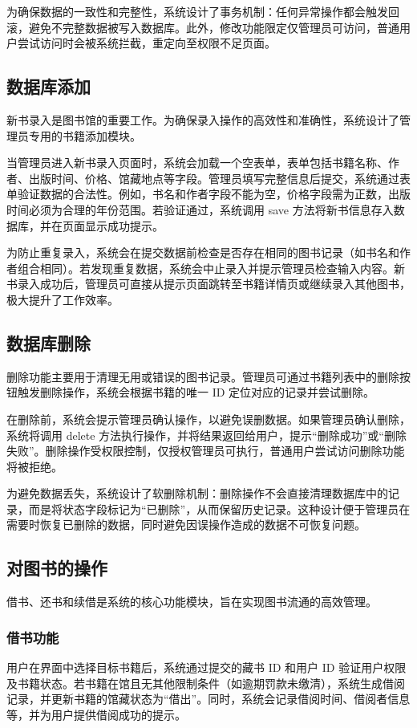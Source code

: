 \documentclass[a4paper,14pt]{article}
\begin{document}
为确保数据的一致性和完整性，系统设计了事务机制：任何异常操作都会触发回滚，避免不完整数据被写入数据库。此外，修改功能限定仅管理员可访问，普通用户尝试访问时会被系统拦截，重定向至权限不足页面。

\subsection{数据库添加} 新书录入是图书馆的重要工作。为确保录入操作的高效性和准确性，系统设计了管理员专用的书籍添加模块。

当管理员进入新书录入页面时，系统会加载一个空表单，表单包括书籍名称、作者、出版时间、价格、馆藏地点等字段。管理员填写完整信息后提交，系统通过表单验证数据的合法性。例如，书名和作者字段不能为空，价格字段需为正数，出版时间必须为合理的年份范围。若验证通过，系统调用 save\(\) 方法将新书信息存入数据库，并在页面显示成功提示。

为防止重复录入，系统会在提交数据前检查是否存在相同的图书记录（如书名和作者组合相同）。若发现重复数据，系统会中止录入并提示管理员检查输入内容。新书录入成功后，管理员可直接从提示页面跳转至书籍详情页或继续录入其他图书，极大提升了工作效率。

\subsection{数据库删除} 删除功能主要用于清理无用或错误的图书记录。管理员可通过书籍列表中的删除按钮触发删除操作，系统会根据书籍的唯一 ID 定位对应的记录并尝试删除。

在删除前，系统会提示管理员确认操作，以避免误删数据。如果管理员确认删除，系统将调用 delete\(\) 方法执行操作，并将结果返回给用户，提示“删除成功”或“删除失败”。删除操作受权限控制，仅授权管理员可执行，普通用户尝试访问删除功能将被拒绝。

为避免数据丢失，系统设计了软删除机制：删除操作不会直接清理数据库中的记录，而是将状态字段标记为“已删除”，从而保留历史记录。这种设计便于管理员在需要时恢复已删除的数据，同时避免因误操作造成的数据不可恢复问题。

\subsection{对图书的操作} 借书、还书和续借是系统的核心功能模块，旨在实现图书流通的高效管理。

\subsubsection{借书功能}
用户在界面中选择目标书籍后，系统通过提交的藏书 ID 和用户 ID 验证用户权限及书籍状态。若书籍在馆且无其他限制条件（如逾期罚款未缴清），系统生成借阅记录，并更新书籍的馆藏状态为“借出”。同时，系统会记录借阅时间、借阅者信息等，并为用户提供借阅成功的提示。
\end{document}
